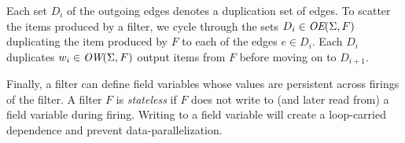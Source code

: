 Each set $D_i$ of the outgoing edges denotes a duplication set of
edges. To scatter the items produced by a filter, we cycle through the
sets $D_i \in \mbox{\it OE}(\Sigma, F)$ duplicating the item produced by $F$
to each of the edges $e \in D_i$. Each $D_i$ duplicates $w_i \in
\mbox{\it OW}(\Sigma, F)$ output items from $F$ before moving on to
$D_{i+1}$.

Finally, a filter can define field variables whose values are
persistent across firings of the filter.  A filter $F$ is {\it
stateless} if $F$ does not write to (and later read from) a field
variable during firing.  Writing to a field variable will create a
loop-carried dependence and prevent data-parallelization.

